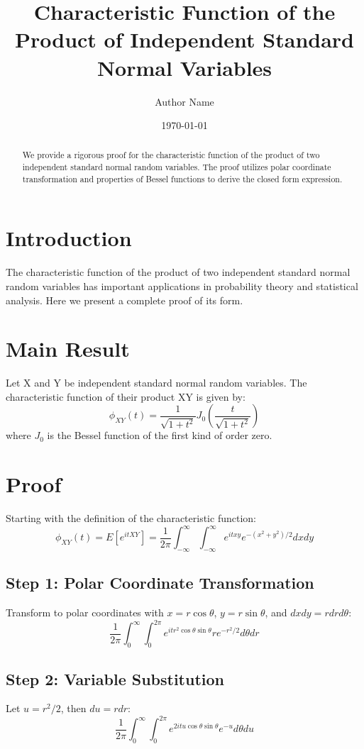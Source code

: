 \documentclass[12pt,a4paper]{article}
\title{Characteristic Function of the Product of Independent Standard Normal Variables}
\author{Author Name}
\date{\today}
\begin{document}
\maketitle

\begin{abstract}
We provide a rigorous proof for the characteristic function of the product of two independent standard normal random variables. The proof utilizes polar coordinate transformation and properties of Bessel functions to derive the closed form expression.
\end{abstract}

\section{Introduction}
The characteristic function of the product of two independent standard normal random variables has important applications in probability theory and statistical analysis. Here we present a complete proof of its form.

\section{Main Result}
\begin{theorem}
Let X and Y be independent standard normal random variables. The characteristic function of their product XY is given by:
\[\phi_{XY}(t) = \frac{1}{\sqrt{1+t^2}} J_0\left(\frac{t}{\sqrt{1+t^2}}\right)\]
where $J_0$ is the Bessel function of the first kind of order zero.
\end{theorem}

\section{Proof}
Starting with the definition of the characteristic function:
\[\phi_{XY}(t) = E[e^{itXY}] = \frac{1}{2\pi}\int_{-\infty}^{\infty}\int_{-\infty}^{\infty} e^{itxy} e^{-(x^2+y^2)/2} dx dy\]

\subsection{Step 1: Polar Coordinate Transformation}
Transform to polar coordinates with $x = r\cos\theta$, $y = r\sin\theta$, and $dx dy = r dr d\theta$:
\[\frac{1}{2\pi}\int_0^{\infty}\int_0^{2\pi} e^{itr^2\cos\theta\sin\theta} re^{-r^2/2} d\theta dr\]

\subsection{Step 2: Variable Substitution}
Let $u = r^2/2$, then $du = r dr$:
\[\frac{1}{2\pi}\int_0^{\infty}\int_0^{2\pi} e^{2itu\cos\theta\sin\theta} e^{-u} d\theta du\]
\end{document}
